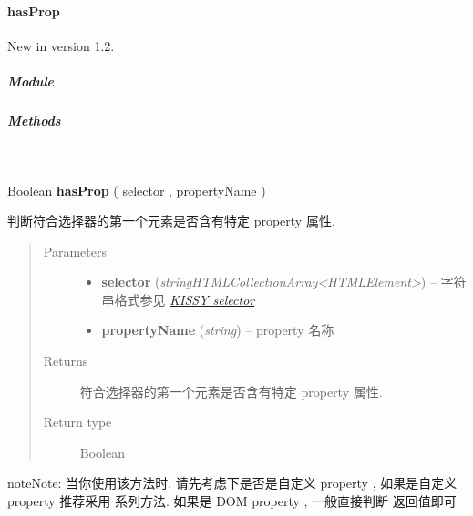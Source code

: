 \documentclass[letterpaper,10pt,english]{sphinxmanual}
\begin{document}
\paragraph{hasProp}
\label{api/core/dom/hasProp:hasprop}\label{api/core/dom/hasProp::doc}New in version 1.2.

\subparagraph{Module}
\label{api/core/dom/hasProp:module}\begin{quote}

{\hyperref[api/core/dom/index:module-DOM]{}}
\end{quote}


\subparagraph{Methods}
\label{api/core/dom/hasProp:methods}

\begin{fulllineitems}
\label{api/core/dom/hasProp:DOM.hasProp}~
\begin{DUlineblock}{0em}
\item[] Boolean \textbf{hasProp} ( selector , propertyName )
\item[] 判断符合选择器的第一个元素是否含有特定 property 属性.
\end{DUlineblock}
\begin{quote}\begin{description}
\item[{Parameters}] \leavevmode\begin{itemize}
\item {}
\textbf{selector} (\emph{string\textbar{}HTMLCollection\textbar{}Array\textless{}HTMLElement\textgreater{}}) -- 字符串格式参见 {\hyperref[api/core/dom/selector:dom-selector]{\emph{KISSY selector}}}

\item {}
\textbf{propertyName} (\emph{string}) -- property 名称

\end{itemize}

\item[{Returns}] \leavevmode
符合选择器的第一个元素是否含有特定 property 属性.

\item[{Return type}] \leavevmode
Boolean

\end{description}\end{quote}

\begin{notice}{note}{Note:}
当你使用该方法时, 请先考虑下是否是自定义 property , 如果是自定义 property 推荐采用 {\hyperref[api/core/dom/data:DOM.data]{}} 系列方法.
如果是 DOM property , 一般直接判断 {\hyperref[api/core/dom/prop:DOM.prop]{}} 返回值即可
\end{notice}

\end{fulllineitems}
\end{document}
